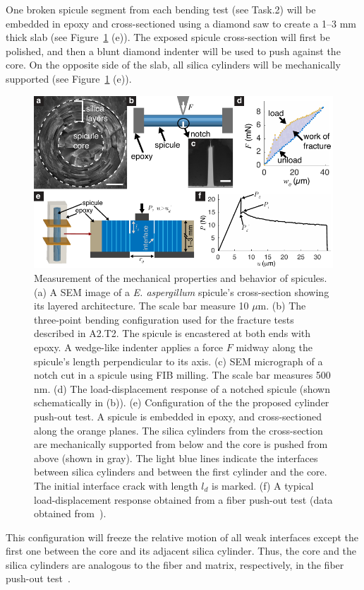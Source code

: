 \documentclass[10pt,letterpaper]{article}
\begin{document}
        One broken spicule segment from each bending test (see Task.2) will be embedded in epoxy and cross-sectioned using a diamond saw to create a 1--3 mm thick slab (see Figure~\ref{f:exp} (e)).
        The exposed spicule cross-section will first be polished, and then a blunt diamond indenter will be used to push against the core.
        On the opposite side of the slab, all silica cylinders will be mechanically supported (see Figure~\ref{f:exp} (e)).
        \begin{figure}[t!]
          \centering
            \includegraphics[width=\textwidth]{Figures/spicule/Layer_spicule_ver11.pdf}
            \caption{\footnotesize Measurement of the mechanical properties and behavior of spicules. (a) A SEM image of a \textit{E. aspergillum} spicule's cross-section showing its layered architecture. The scale bar measure 10 $\mu$m. (b) The three-point bending configuration used for the fracture tests described in A2.T2. The spicule is encastered at both ends with epoxy. A wedge-like indenter applies a force $F$ midway along the spicule's length perpendicular to its axis. (c) SEM micrograph of a notch cut in a spicule using FIB milling. The scale bar measures 500 nm. (d) The load-displacement response of a notched spicule (shown schematically in (b)). (e) Configuration of the the proposed cylinder push-out test. A spicule is embedded in epoxy, and cross-sectioned along the orange planes. The silica cylinders from the cross-section are mechanically supported from below and the core is pushed from above (shown in gray). The light blue lines indicate the interfaces between silica cylinders and between the first cylinder and the core. The initial interface crack with length $l_d$ is marked. (f) A typical load-displacement response obtained from a fiber push-out test (data obtained from~\cite{bright1989interfacial}).}
            \label{f:exp}
        \end{figure}
        This configuration will freeze the relative motion of all weak interfaces except the first one between the core and its adjacent silica cylinder.
        Thus, the core and the silica cylinders are analogous to the fiber and matrix, respectively, in the fiber push-out test~\cite{marshall1984indentation}.
\end{document}
